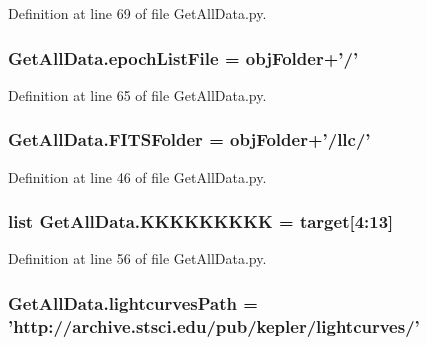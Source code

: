 Definition at line 69 of file Get\-All\-Data.\-py.

\hypertarget{namespace_get_all_data_ac9174f2a0b0215a84e06e5f8a4f5e5e6}{
\subsubsection[{epoch\-List\-File}]{ Get\-All\-Data.\-epoch\-List\-File = {\bf obj\-Folder}+'/'}}\label{namespace_get_all_data_ac9174f2a0b0215a84e06e5f8a4f5e5e6}


Definition at line 65 of file Get\-All\-Data.\-py.

\hypertarget{namespace_get_all_data_a16ca85b9e5a52cb403c24f90f47e5380}{
\subsubsection[{F\-I\-T\-S\-Folder}]{ Get\-All\-Data.\-F\-I\-T\-S\-Folder = {\bf obj\-Folder}+'/llc/'}}\label{namespace_get_all_data_a16ca85b9e5a52cb403c24f90f47e5380}


Definition at line 46 of file Get\-All\-Data.\-py.

\hypertarget{namespace_get_all_data_a8ae2235ff0e5280acf89f07808293bda}{
\subsubsection[{K\-K\-K\-K\-K\-K\-K\-K\-K}]{\setlength{\rightskip}{0pt plus 5cm}list Get\-All\-Data.\-K\-K\-K\-K\-K\-K\-K\-K\-K = {\bf target}\mbox{[}4\-:13\mbox{]}}}\label{namespace_get_all_data_a8ae2235ff0e5280acf89f07808293bda}


Definition at line 56 of file Get\-All\-Data.\-py.

\hypertarget{namespace_get_all_data_aa7dab644473a8e6caaa150aa36384dbe}{
\subsubsection[{lightcurves\-Path}]{ Get\-All\-Data.\-lightcurves\-Path = 'http\-://archive.\-stsci.\-edu/pub/kepler/lightcurves/'}}\label{namespace_get_all_data_aa7dab644473a8e6caaa150aa36384dbe}


